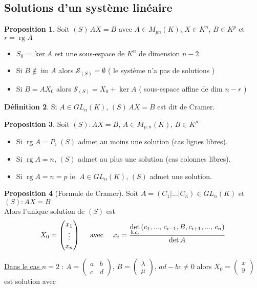 \documentclass[10pt,a4paper]{article}
\theoremstyle{definition}
\newtheorem{proposition}{Proposition}[section]
\newtheorem{definition}[proposition]{Définition}
\DeclareMathOperator{\rg}{rg}
\DeclareMathOperator{\im}{im}
\begin{document}
\subsection{Solutions d'un système linéaire}
\begin{proposition}
Soit $(S) \, AX = B$ avec $A \in M_{pn}(K)$, $X \in K^n$, $B \in K^p$ et $r = \rg A$
\begin{itemize}
\item $S_0 = \ker A$ est une sous-espace de $K^n$ de dimension $n - 2$
\item Si $B \notin \im A$ alors $\mathcal{S}_{(S)} = \emptyset$ ( le système n'a pas de solutions )
\item Si $B = A X_0$ alors $\mathcal{S}_{(S)} = X_0 + \ker A$ ( sous-espace affine de dim $n - r$ )
\end{itemize}
\end{proposition}
\begin{definition}
Si $A \in GL_n(K)$, $(S) \, AX = B$ est  dit de Cramer.
\end{definition}
\begin{proposition}
Soit $(S) : AX = B$, $A \in M_{p, n}(K)$, $B \in K^p$
\begin{itemize}
\item Si $\rg A = P$, $(S)$ admet au moins une solution (cas lignes libres).
\item Si $\rg A = n$, $(S)$ admet au plus une solution (cas colonnes libres).
\item Si $\rg A = n = p$ ie. $A \in GL_n(K)$, $(S)$ admet une solution.
\end{itemize}
\end{proposition}
\begin{proposition}[Formule de Cramer]
Soit $A = (C_1 | ... | C_n) \in GL_n(K)$ et $(S) : AX = B$ \\
Alors l'unique solution de $(S)$ est  
\[X_0 = \begin{pmatrix}
x_1 \\
\vdots \\
x_n
\end{pmatrix} \text{ \quad avec \quad } x_i = \frac{\det\limits_{b.c.}\left(c_1, ...,\, c_{i - 1}, B, c_{i + 1}, ...,\, c_n\right)}{\det A} \]
\end{proposition}
\noindent \uline{Dans le cas $n = 2$} :
$A = \begin{pmatrix}
a & b \\
c & d
\end{pmatrix}$, $B = \begin{pmatrix}
\lambda \\
\mu
\end{pmatrix}$, $ad - bc \neq 0$ alors $X_0 = \begin{pmatrix}
x \\
y
\end{pmatrix}$ est solution avec
\end{document}
